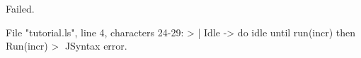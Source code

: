 \runverbatimfalse
{}
\begin{RunVerbatimMsg}
Failed.
\end{RunVerbatimMsg}
\begin{RunVerbatimErr}
File "tutorial.ls", line 4, characters 24-29:
>      | Idle -> do idle until run(incr) then Run(incr)
>                        ^^^^^
Syntax error.
\end{RunVerbatimErr}
